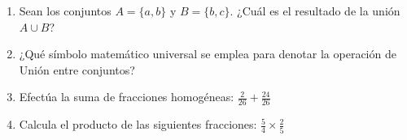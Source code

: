 \documentclass[10pt,a4paper]{article}
\begin{document}
\begin{enumerate}[label=\textbf{\arabic*.}]
\begin{enumerate}[label=\textbf{\Alph*)}]
\end{enumerate}
\vspace{0.15cm}
\item Sean los conjuntos \(A = \{a, b\}\) y \(B = \{b, c\}\). ¿Cuál es el resultado de la unión \(A \cup B\)?
\begin{enumerate}[label=\textbf{\Alph*)}]
\end{enumerate}
\vspace{0.15cm}
\item ¿Qué símbolo matemático universal se emplea para denotar la operación de Unión entre conjuntos?
\begin{enumerate}[label=\textbf{\Alph*)}]
\end{enumerate}
\vspace{0.15cm}
\item Efectúa la suma de fracciones homogéneas: \(\frac{2}{26} + \frac{24}{26}\)
\begin{enumerate}[label=\textbf{\Alph*)}]
\end{enumerate}
\vspace{0.15cm}
\item Calcula el producto de las siguientes fracciones: \(\frac{5}{4} \times \frac{2}{5}\)
\begin{enumerate}[label=\textbf{\Alph*)}]

\end{enumerate}
\end{enumerate}
\end{document}
